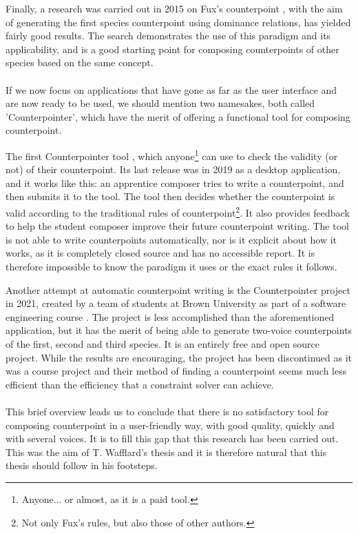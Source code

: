 Finally, a research was carried out in 2015 on Fux's counterpoint \cite{komosinski2015automatic}, with the aim of generating the first species counterpoint using dominance relations, has yielded fairly good results. The search demonstrates the use of this paradigm and its applicability, and is a good starting point for composing counterpoints of other species based on the same concept.

\paragraph{}
If we now focus on applications that have gone as far as the user interface and are now ready to be used, we should mention two namesakes, both called 'Counterpointer', which have the merit of offering a functional tool for composing counterpoint.

The first Counterpointer tool \cite{counterpointer_ms}, which anyone\footnote{Anyone... or almost, as it is a paid tool.} can use to check the validity (or not) of their counterpoint. Its last release was in 2019 as a desktop application, and it works like this: an apprentice composer tries to write a counterpoint, and then submits it to the tool. The tool then decides whether the counterpoint is valid according to the traditional rules of counterpoint\footnote{Not only Fux's rules, but also those of other authors.}. It also provides feedback to help the student composer improve their future counterpoint writing. The tool is not able to write counterpoints automatically, nor is it explicit about how it works, as it is completely closed source and has no accessible report. It is therefore impossible to know the paradigm it uses or the exact rules it follows.

Another attempt at automatic counterpoint writing is the Counterpointer project in 2021, created by a team of students at Brown University as part of a software engineering course \cite{counterpointer_project}. The project is less accomplished than the aforementioned application, but it has the merit of being able to generate two-voice counterpoints of the first, second and third species. It is an entirely free and open source project. While the results are encouraging, the project has been discontinued as it was a course project and their method of finding a counterpoint seems much less efficient than the efficiency that a constraint solver can achieve. 


\paragraph{}
This brief overview leads us to conclude that there is no satisfactory tool for composing counterpoint in a user-friendly way, with good quality, quickly and with several voices. It is to fill this gap that this research has been carried out. This was the aim of T. Wafflard's thesis and it is therefore natural that this thesis should follow in his footsteps.




